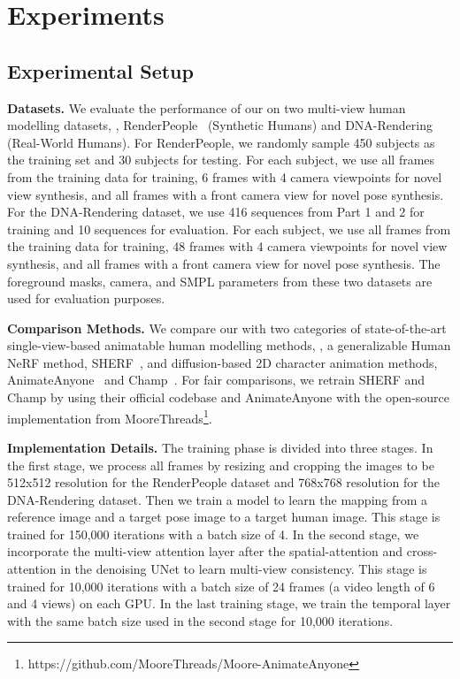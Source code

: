 \section{Experiments}



\subsection{Experimental Setup}

\noindent \textbf{Datasets.} 
We evaluate the performance of our \nickname{} on two multi-view human modelling datasets, \ie, RenderPeople~\cite{renderpeople} (Synthetic Humans) and DNA-Rendering~\cite{cheng2023dna} (Real-World Humans).
For RenderPeople, we randomly sample 450 subjects as the training set and 30 subjects for testing.
For each subject, we use all frames from the training data for training, 6 frames with 4 camera viewpoints for novel view synthesis, and all frames with a front camera view for novel pose synthesis. 
For the DNA-Rendering dataset, we use 416 sequences from Part 1 and 2 for training and 10 sequences for evaluation.
For each subject, we use all frames from the training data for training, 48 frames with 4 camera viewpoints for novel view synthesis, and all frames with a front camera view for novel pose synthesis. 
The foreground masks, camera, and SMPL parameters from these two datasets are used for evaluation purposes.

\noindent \textbf{Comparison Methods.}
We compare our \nickname{} with two categories of state-of-the-art single-view-based animatable human modelling methods, \ie, a generalizable Human NeRF method, SHERF~\cite{hu2023sherf}, and diffusion-based 2D character animation methods, AnimateAnyone~\cite{hu2024animate} and Champ~\cite{zhu2024champ}.
For fair comparisons, we retrain SHERF and Champ by using their official codebase and AnimateAnyone with the open-source implementation from MooreThreads\footnote{https://github.com/MooreThreads/Moore-AnimateAnyone}.

\noindent \textbf{Implementation Details.} 
The training phase is divided into three stages. In the first stage, we process all frames by resizing and cropping the images to be 512x512 resolution for the RenderPeople dataset and 768x768 resolution for the DNA-Rendering dataset. 
Then we train a model to learn the mapping from a reference image and a target pose image to a target human image. 
This stage is trained for 150,000 iterations with a batch size of 4. 
In the second stage, we incorporate the multi-view attention layer after the spatial-attention and cross-attention in the denoising UNet to learn multi-view consistency. 
This stage is trained for 10,000 iterations with a batch size of 24 frames (a video length of 6 and 4 views) on each GPU. 
In the last training stage, we train the temporal layer with the same batch size used in the second stage for 10,000 iterations.

